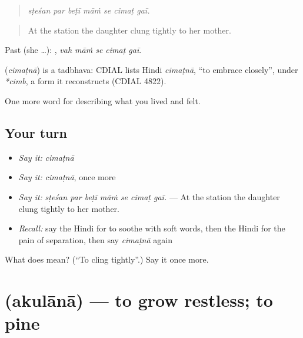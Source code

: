 \begin{quote}
\emph{sṭeśan par beṭī māṁ se cimaṭ gaī.}
\end{quote}

\begin{quote}
At the station the daughter clung tightly to her mother.
\end{quote}

Past (she …):     , \emph{vah māṁ se cimaṭ gaī}.

\begin{cousinweb}
\textbf{} (\emph{cimaṭnā}) is a tadbhava: CDIAL lists Hindi \emph{cimaṭnā}, \textquotedblleft{}to embrace closely\textquotedblright{}, under \emph{*cimb}, a form it reconstructs (CDIAL 4822).
\end{cousinweb}

\begin{grammarlens}[title={What you've built}]
One more word for describing what you lived and felt.
\end{grammarlens}

\subsection*{Your turn}
\begin{itemize}
\raggedright
  \item \emph{Say it:} \emph{cimaṭnā}
  \item \emph{Say it:} \emph{cimaṭnā}, once more
  \item \emph{Say it:} \emph{sṭeśan par beṭī māṁ se cimaṭ gaī.} — At the station the daughter clung tightly to her mother.
  \item \emph{Recall:} say the Hindi for to soothe with soft words, then the Hindi for the pain of separation, then say \emph{cimaṭnā} again
\end{itemize}

\begin{tcolorbox}[breakable,colback=teal!4,colframe=teal!35!black,title={Before you move on}]
What does  mean? (\textquotedblleft{}To cling tightly\textquotedblright{}.) Say it once more.
\end{tcolorbox}
\section[\texorpdfstring{\hi{अकुलाना} (akulānā)}{अकुलाना (akulānā)}]{ (akulānā) — to grow restless; to pine}

\label{lesson:HI-C460-akulana}



